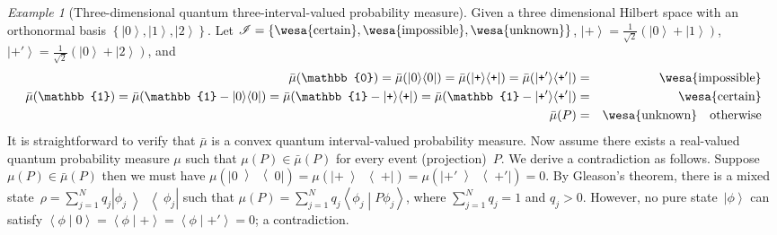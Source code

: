 \documentclass{article}
\theoremstyle{remark}
\newtheorem{example}{Example}
\newcommand{\imposs}{{\mbox{\wesa{impossible}}}}
\newcommand{\necess}{{\mbox{\wesa{certain}}}}
\newcommand{\unknown}{{\mbox{\wesa{unknown}}}}
\newcommand{\ket}[1]{{\left\vert{#1}\right\rangle}}
\newcommand{\op}[2]{\ensuremath{\left\vert{#1}\middle\rangle\middle\langle{#2}\right\vert}}
\newcommand{\proj}[1]{\op{#1}{#1}}
\newcommand{\ps}{\texttt{+}}
\newcommand{\ip}[2]{\ensuremath{\left\langle{#1}\middle\vert{#2}\right\rangle}}
\begin{document}
\begin{example}[Three-dimensional quantum three-interval-valued 
  probability measure]\label{ex:three-dimensional-three-value} Given
  a three dimensional Hilbert space with an orthonormal basis
  $\left\{ \ket{0},\ket{1},\ket{2}\right\} $.  Let \emph{
    $\mathscr{I}=\left\{ \necess,\imposs,\unknown\right\} $},
  $\ket{\ps}=\frac{1}{\sqrt{2}}(\ket{0}+\ket{1})$,
  $\ket{\ps'}=\frac{1}{\sqrt{2}}(\ket{0}+\ket{2})$, and
\begin{eqnarray*}
\bar{\mu}(\mathbb{0})=\bar{\mu}(\proj{0})=\bar{\mu}(\proj{\ps})=\bar{\mu}(\proj{\ps'})
  &=& \imposs\\
\bar{\mu}(\mathbb{1})=\bar{\mu}(\mathbb{1}-\proj{0})=\bar{\mu}(\mathbb{1}-\proj{\ps})=\bar{\mu}(\mathbb{1}-\proj{\ps'})
  &=& \necess \\
\bar{\mu}(P) 
  &=& \unknown\quad\textrm{otherwise}
\end{eqnarray*}
It is straightforward to verify that $\bar{\mu}$ is a convex quantum
interval-valued probability measure. Now assume there exists a
real-valued quantum probability measure $\mu$ such that
$\mu(P)\in\bar{\mu}(P)$ for every event (projection)~$P$. We derive a
contradiction as follows. Suppose $\mu(P)\in\bar{\mu}(P)$ then we must
have $\mu(\proj{0})=\mu(\proj{\ps})=\mu(\proj{\ps'})=0$. By Gleason's
theorem, there is a mixed
state~$\rho=\sum_{j=1}^{N}q_{j}\proj{\phi_{j}}$ such that
$\mu\left(P\right)=\sum_{j=1}^{N}q_{j}\ip{\phi_{j}}{P\phi_{j}}$, where
$\sum_{j=1}^{N}q_{j}=1$ and $q_{j}>0$.  However, no pure
state~$\ket{\phi}$ can satisfy
$\ip{\phi}{0}=\ip{\phi}{\ps}=\ip{\phi}{\ps'}=0$; a contradiction.
\end{example}
\end{document}
